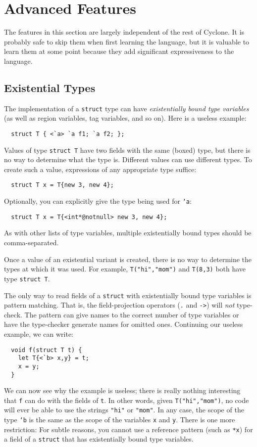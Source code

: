 \section{Advanced Features}
\label{sec:advanced}

The features in this section are largely independent of the rest of
Cyclone.  It is probably safe to skip them when first learning the
language, but it is valuable to learn them at some point because they
add significant expressiveness to the language.

\subsection{Existential Types}

The implementation of a \texttt{struct} type can have
\emph{existentially bound type variables} (as well as region
variables, tag variables, and so on).  Here is a useless example:
\begin{verbatim}
  struct T { <`a> `a f1; `a f2; };
\end{verbatim}
Values of type \texttt{struct T} have two fields with the same (boxed)
type, but there is no way to determine what the type is.  Different
values can use different types.  To create
such a value, expressions of any appropriate type suffice:
\begin{verbatim}
  struct T x = T{new 3, new 4};
\end{verbatim}
Optionally, you can explicitly give the type being used for
\texttt{`a}:
\begin{verbatim}
  struct T x = T{<int*@notnull> new 3, new 4};
\end{verbatim}
As with other lists of type variables, multiple existentially bound
types should be comma-separated.

Once a value of an existential variant is created, there is no way to
determine the types at which it was used.  For example,
\texttt{T("hi","mom")} and \texttt{T(8,3)} both have type
\texttt{struct T}.

The only way to read fields of a \texttt{struct} with existentially
bound type variables is pattern matching.  That is, the
field-projection operators (\texttt{.} and \texttt{->}) will
\emph{not} type-check.  The pattern can give names to the correct
number of type variables or have the type-checker generate names for
omitted ones.
Continuing our useless example, we can write:
\begin{verbatim}
  void f(struct T t) {
    let T{<`b> x,y} = t;
    x = y;
  }
\end{verbatim}
We can now see why the example is useless; there is really nothing
interesting that \texttt{f} can do with the fields of \texttt{t}.  In
other words, given \texttt{T("hi","mom")}, no code will ever be
able to use the strings \texttt{"hi"} or \texttt{"mom"}. In any case,
the scope of the type \texttt{`b} is the same as the scope of the
variables \texttt{x} and \texttt{y}.  There is one more restriction:
For subtle reasons, you cannot use a reference pattern (such as
\texttt{*x}) for a field of a \texttt{struct} that has existentially
bound type variables.

